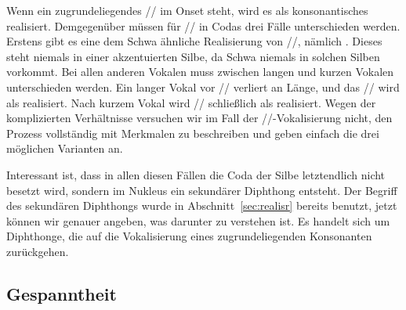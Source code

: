 \begin{exe}
  \ex\label{ex:phol9906}
  \begin{xlist}
  \end{xlist}
\end{exe}

Wenn ein zugrundeliegendes // im Onset steht, wird es als konsonantisches \textipa{[K]} realisiert.
Demgegenüber müssen für // in Codas drei Fälle unterschieden werden.
Erstens gibt es eine dem Schwa ähnliche Realisierung von //, nämlich \textipa{[5]}.
Dieses steht niemals in einer akzentuierten Silbe, da Schwa niemals in solchen Silben vorkommt.
Bei allen anderen Vokalen muss zwischen langen und kurzen Vokalen unterschieden werden.
Ein langer Vokal vor // verliert an Länge, und das // wird als \textipa{[5]} realisiert.
Nach kurzem Vokal wird // schließlich als \textipa{[@]} realisiert.
Wegen der komplizierten Verhältnisse versuchen wir im Fall der //-Vokalisierung nicht, den Prozess vollständig mit Merkmalen zu beschreiben und geben einfach die drei möglichen Varianten an.


Interessant ist, dass in allen diesen Fällen die Coda der Silbe letztendlich nicht besetzt wird, sondern im Nukleus ein sekundärer Diphthong entsteht.
Der Begriff des sekundären Diphthongs wurde in Abschnitt~\ref{sec:realisr} bereits benutzt, jetzt können wir genauer angeben, was darunter zu verstehen ist.
Es handelt sich um Diphthonge, die auf die Vokalisierung eines zugrundeliegenden Konsonanten zurückgehen.


\subsection{Gespanntheit}

\label{sec:gespanntheit}

